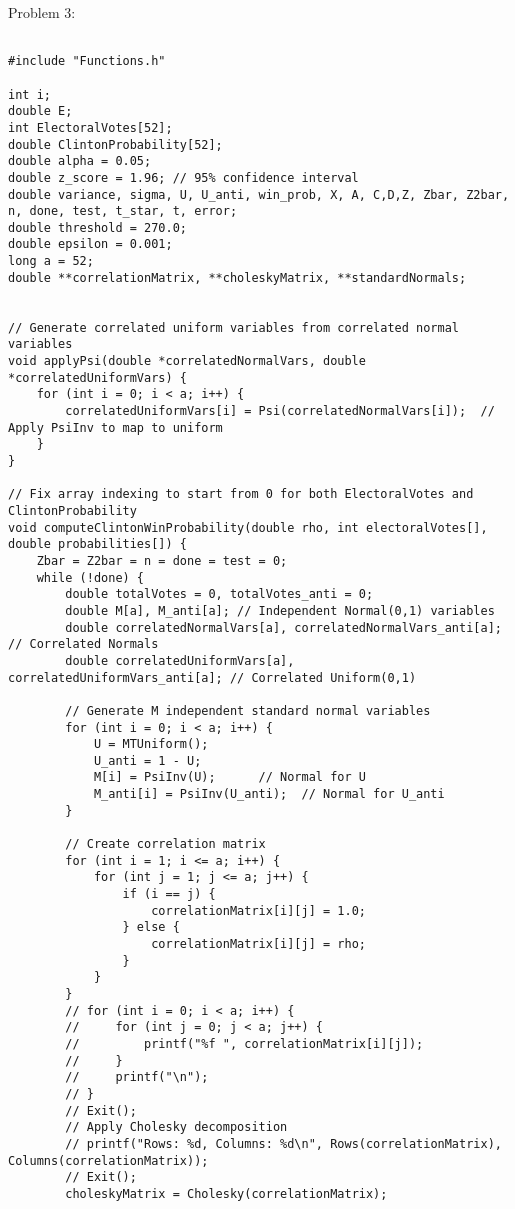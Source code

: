 \documentclass{report}
\begin{document}
Problem 3:
\begin{lstlisting}

#include "Functions.h"

int i;
double E;
int ElectoralVotes[52];
double ClintonProbability[52];
double alpha = 0.05;
double z_score = 1.96; // 95% confidence interval
double variance, sigma, U, U_anti, win_prob, X, A, C,D,Z, Zbar, Z2bar, n, done, test, t_star, t, error; 
double threshold = 270.0;
double epsilon = 0.001;
long a = 52;
double **correlationMatrix, **choleskyMatrix, **standardNormals;


// Generate correlated uniform variables from correlated normal variables
void applyPsi(double *correlatedNormalVars, double *correlatedUniformVars) {
    for (int i = 0; i < a; i++) {
        correlatedUniformVars[i] = Psi(correlatedNormalVars[i]);  // Apply PsiInv to map to uniform
    }
}

// Fix array indexing to start from 0 for both ElectoralVotes and ClintonProbability
void computeClintonWinProbability(double rho, int electoralVotes[], double probabilities[]) {
    Zbar = Z2bar = n = done = test = 0;
    while (!done) {
        double totalVotes = 0, totalVotes_anti = 0;
        double M[a], M_anti[a]; // Independent Normal(0,1) variables
        double correlatedNormalVars[a], correlatedNormalVars_anti[a]; // Correlated Normals
        double correlatedUniformVars[a], correlatedUniformVars_anti[a]; // Correlated Uniform(0,1)

        // Generate M independent standard normal variables
        for (int i = 0; i < a; i++) {
            U = MTUniform();
            U_anti = 1 - U;
            M[i] = PsiInv(U);      // Normal for U
            M_anti[i] = PsiInv(U_anti);  // Normal for U_anti
        }

        // Create correlation matrix 
        for (int i = 1; i <= a; i++) {
            for (int j = 1; j <= a; j++) {
                if (i == j) {
                    correlationMatrix[i][j] = 1.0;
                } else {
                    correlationMatrix[i][j] = rho;
                }
            }
        }
        // for (int i = 0; i < a; i++) {
        //     for (int j = 0; j < a; j++) {
        //         printf("%f ", correlationMatrix[i][j]);
        //     }
        //     printf("\n");
        // }
        // Exit();
        // Apply Cholesky decomposition
        // printf("Rows: %d, Columns: %d\n", Rows(correlationMatrix), Columns(correlationMatrix));
        // Exit();
        choleskyMatrix = Cholesky(correlationMatrix);


\end{lstlisting}
\end{document}
